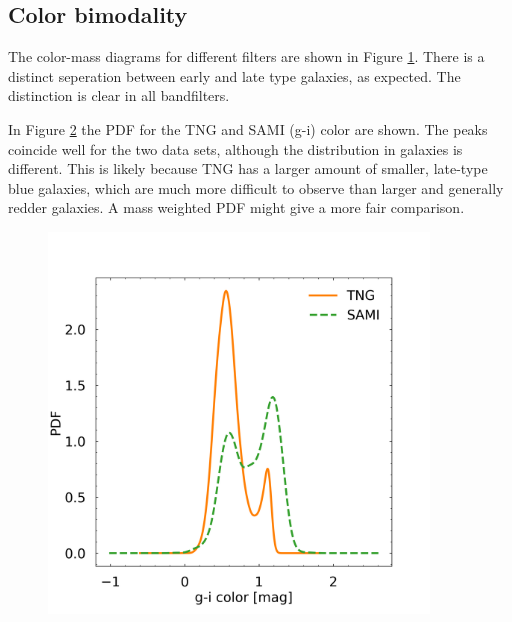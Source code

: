 \subsection{Color bimodality}
The color-mass diagrams for different filters are shown in Figure \ref{color_magnitude_res}. There is a distinct seperation between early and late type galaxies, as expected. The distinction is clear in all bandfilters. 

In Figure \ref{pdf_color} the PDF for the TNG and SAMI (g-i) color are shown. The peaks coincide well for the two data sets, although the distribution in galaxies is different. This is likely because TNG has a larger amount of smaller, late-type blue galaxies, which are much more difficult to observe than larger and generally redder galaxies. A mass weighted PDF might give a more fair comparison.

\begin{figure}
    \centering
    \caption{}
    \label{color_magnitude_res}
\end{figure}


\begin{figure}
    \centering
    \includegraphics[width=0.9\textwidth]{images/results_pdf_g_i_band.png}
    \caption{}
    \label{pdf_color}
\end{figure}

